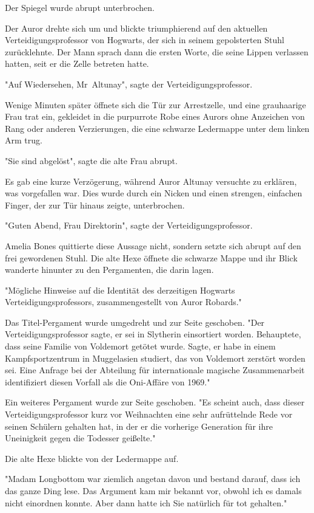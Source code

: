 {Der Spiegel wurde abrupt unterbrochen.

Der Auror drehte sich um und blickte triumphierend auf den aktuellen Verteidigungsprofessor von Hogwarts, der sich in seinem gepolsterten Stuhl zurücklehnte. Der Mann sprach dann die ersten Worte, die seine Lippen verlassen hatten, seit er die Zelle betreten hatte.

"Auf Wiedersehen, Mr~Altunay", sagte der Verteidigungsprofessor.

Wenige Minuten später öffnete sich die Tür zur Arrestzelle, und eine grauhaarige Frau trat ein, gekleidet in die purpurrote Robe eines Aurors ohne Anzeichen von Rang oder anderen Verzierungen, die eine schwarze Ledermappe unter dem linken Arm trug.

"Sie sind abgelöst", sagte die alte Frau abrupt.

Es gab eine kurze Verzögerung, während Auror Altunay versuchte zu erklären, was vorgefallen war. Dies wurde durch ein Nicken und einen strengen, einfachen Finger, der zur Tür hinaus zeigte, unterbrochen.

"Guten Abend, Frau Direktorin", sagte der Verteidigungsprofessor.

Amelia Bones quittierte diese Aussage nicht, sondern setzte sich abrupt auf den frei gewordenen Stuhl. Die alte Hexe öffnete die schwarze Mappe und ihr Blick wanderte hinunter zu den Pergamenten, die darin lagen.

"Mögliche Hinweise auf die Identität des derzeitigen Hogwarts Verteidigungsprofessors, zusammengestellt von Auror Robards."

Das Titel-Pergament wurde umgedreht und zur Seite geschoben. "Der Verteidigungsprofessor sagte, er sei in Slytherin einsortiert worden. Behauptete, dass seine Familie von Voldemort getötet wurde. Sagte, er habe in einem Kampfsportzentrum in Muggelasien studiert, das von Voldemort zerstört worden sei. Eine Anfrage bei der Abteilung für internationale magische Zusammenarbeit identifiziert diesen Vorfall als die Oni-Affäre von 1969."

Ein weiteres Pergament wurde zur Seite geschoben. "Es scheint auch, dass dieser Verteidigungsprofessor kurz vor Weihnachten eine sehr aufrüttelnde Rede vor seinen Schülern gehalten hat, in der er die vorherige Generation für ihre Uneinigkeit gegen die Todesser geißelte."

Die alte Hexe blickte von der Ledermappe auf.

"Madam Longbottom war ziemlich angetan davon und bestand darauf, dass ich das ganze Ding lese. Das Argument kam mir bekannt vor, obwohl ich es damals nicht einordnen konnte. Aber dann hatte ich Sie natürlich für tot gehalten."

}
